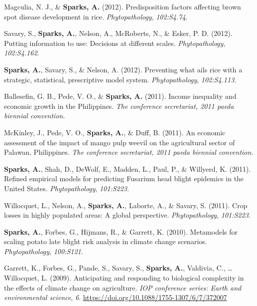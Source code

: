 \documentclass[11pt, a4paper]{awesome-cv}
\begin{document}
\leavevmode\hypertarget{ref-Magculia2012}{}%
Magculia, N. J., \& \textbf{Sparks, A.} (2012). Predisposition factors affecting brown spot disease development in rice. \emph{Phytopathology}, \emph{102:S4.74}.

\leavevmode\hypertarget{ref-Savary2012}{}%
Savary, S., \textbf{Sparks, A.}, Nelson, A., McRoberts, N., \& Esker, P. D. (2012). Putting information to use: Decisions at different scales. \emph{Phytopathology}, \emph{102:S4.162}.

\leavevmode\hypertarget{ref-Sparks2012}{}%
\textbf{Sparks, A.}, Savary, S., \& Nelson, A. (2012). Preventing what ails rice with a strategic, statistical, prescriptive model system. \emph{Phytopathology}, \emph{102:S4.113}.

\leavevmode\hypertarget{ref-Ballesefin2011}{}%
Ballesefin, G. B., Pede, V. O., \& \textbf{Sparks, A.} (2011). Income inequality and economic growth in the Philippines. \emph{The conference secretariat, 2011 paeda biennial convention}.

\leavevmode\hypertarget{ref-McKinley2011}{}%
McKinley, J., Pede, V. O., \textbf{Sparks, A.}, \& Duff, B. (2011). An economic assessment of the impact of mango pulp weevil on the agricultural sector of Palawan, Philippines. \emph{The conference secretariat, 2011 paeda biennial convention}.

\leavevmode\hypertarget{ref-Sparks2011a}{}%
\textbf{Sparks, A.}, Shah, D., DeWolf, E., Madden, L., Paul, P., \& Willyerd, K. (2011). Refined empirical models for predicting Fusarium head blight epidemics in the United States. \emph{Phytopathology}, \emph{101:S223}.

\leavevmode\hypertarget{ref-Willocquet2011}{}%
Willocquet, L., Nelson, A., \textbf{Sparks, A.}, Laborte, A., \& Savary, S. (2011). Crop losses in highly populated areas: A global perspective. \emph{Phytopathology}, \emph{101:S223}.

\leavevmode\hypertarget{ref-Sparks2010}{}%
\textbf{Sparks, A.}, Forbes, G., Hijmans, R., \& Garrett, K. (2010). Metamodels for scaling potato late blight risk analysis in climate change scenarios. \emph{Phytopathology}, \emph{100:S121}.

\leavevmode\hypertarget{ref-Garrett2009}{}%
Garrett, K., Forbes, G., Pande, S., Savary, S., \textbf{Sparks, A.}, Valdivia, C., \ldots{} Willocquet, L. (2009). Anticipating and responding to biological complexity in the effects of climate change on agriculture. \emph{IOP conference series: Earth and environmental science}, \emph{6}. \url{https://doi.org/10.1088/1755-1307/6/7/372007}
\end{document}
